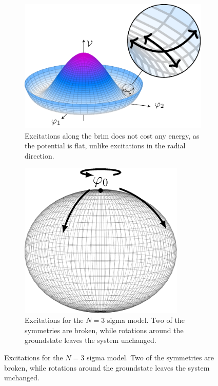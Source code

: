 \begin{figure}[ht]
    \centering
    \begin{subfigure}{0.54\textwidth}
        \centering
        \includegraphics[]{figurer/mexican_hat_zoom.pdf}
        \caption{Excitations along the brim does not cost any energy, as the potential is flat, unlike excitations in the radial direction.}
        \label{fig:Mexican hat zoom}
    \end{subfigure}
    \begin{subfigure}{0.45\textwidth}
        \centering
        \includegraphics[]{figurer/sigma_ground_state.pdf}
        \caption{Excitations for the $N=3$ sigma model. Two of the symmetries are broken, while rotations around the groundstate leaves the system unchanged.}
        \label{fig:ground state manifold}
    \end{subfigure}
\end{figure}

